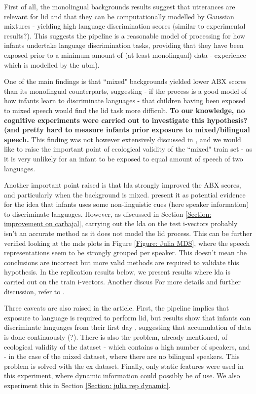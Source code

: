 First of all, the monolingual backgrounds results suggest that utterances are relevant for \acrshort{lid} and that they can be computationally modelled by Gaussian mixtures - yielding high language discrimination scores (similar to experimental results?). This suggests the pipeline is a reasonable model of processing for how infants undertake language discrimination tasks, providing that they have been exposed prior to a minimum amount of (at least monolingual) data - experience which is modelled by the \acrshort{ubm}).

\bigskip

One of the main findings is that ``mixed" backgrounds yielded lower ABX scores than its monolingual counterparts, suggesting - if the process is a good model of how infants learn to discriminate languages - that children having been exposed to mixed speech would find the \acrshort{lid} task more difficult. \textbf{To our knowledge, no cognitive experiments were carried out to investigate this hypothesis? (and pretty hard to measure infants prior exposure to mixed/bilingual speech. } This finding was not however extensively discussed in \citet{carbajal2016language}, and we would like to raise the important point of ecological validity of the ``mixed" train set - as it is very unlikely for an infant to be exposed to equal amount of speech of two languages.

\bigskip

\par Another important point raised is that \acrshort{lda} strongly improved the ABX scores, and particularly when the background is mixed. \citet{carbajal2016language} present it as potential evidence for the idea that infants uses some non-linguistic cues (here speaker information) to discriminate languages. However, as discussed in Section \ref{Section: improvement on carbajal}, carrying out the \acrshort{lda} on the test i-vectors probably isn't an accurate method as it does not model the \acrshort{lid} process.  This can be further verified looking at the \acrshort{mds} plots in Figure \ref{Figure: Julia MDS}, where the speech representations seem to be strongly grouped per speaker. This doesn't mean the conclusions are incorrect but more valid methods are required to validate this hypothesis. In the replication results below, we present results where \acrshort{lda} is carried out on the train i-vectors. 
Another discus
For more details and further discussion, refer to \citet{carbajal2016language}.

\bigskip
Three caveats are also raised in the article. First, the pipeline implies that exposure to language is required to perform \acrshort{lid}, but results show that infants can discriminate languages from their first day , suggesting that accumulation of data is done continuously (?). There is also the problem, already mentioned, of ecological validity of the dataset - which contains a high number of speakers, and - in the case of the mixed dataset, where there are no bilingual speakers. This problem is solved with the \acrshort{ex} dataset. Finally, only static features were used in this experiment, where dynamic information could possibly be of use. We also experiment this in Section \ref{Section: julia rep dynamic}.  


